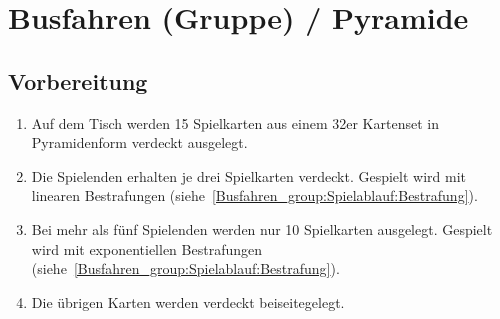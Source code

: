 \chapter{Busfahren (Gruppe) / Pyramide}
\section{Vorbereitung}
\begin{enumerate}[label={(\arabic*)}]
    \item Auf dem Tisch werden 15 Spielkarten aus einem 32er Kartenset in Pyramidenform verdeckt ausgelegt.
    \item Die Spielenden erhalten je drei Spielkarten verdeckt. Gespielt wird mit linearen Bestrafungen (siehe~\ref{Busfahren_group:Spielablauf:Bestrafung}).
    \item Bei mehr als fünf Spielenden werden nur 10 Spielkarten ausgelegt. Gespielt wird mit exponentiellen Bestrafungen (siehe~\ref{Busfahren_group:Spielablauf:Bestrafung}).
    \item Die übrigen Karten werden verdeckt beiseitegelegt.
\end{enumerate}

